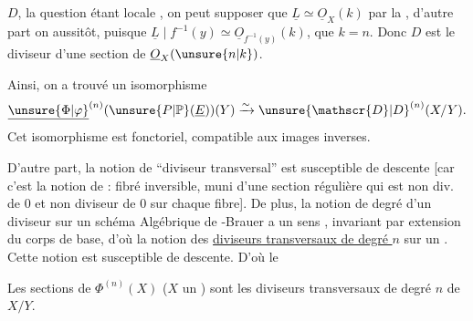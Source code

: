 $D$,  la question étant locale , on peut supposer que $\underline{L}\simeq\underline{O}_X(k)$ par la , d'autre part on  aussitôt, puisque $\underline{L}\mid f^{-1}(y)\simeq\underline{O}_{f^{-1}(y)}(k)$, que $k=n$. Donc $D$ est le diviseur d'une section de $\underline{O}_X(\unsure{n|k})$.

Ainsi, on a  trouvé un isomorphisme 
\[
\underline{\unsure{\Phi|\varphi}}^{(n)}(\unsure{P|\mathbb{P}}(\underline{E}))(Y)\xrightarrow{\sim}{\unsure{\mathscr{D}|D}}^{(n)}(X/Y).
\]
Cet isomorphisme est fonctoriel, compatible aux images inverses.

D'autre part, la notion de ``diviseur  transversal'' est susceptible de descente [car c'est la notion de : fibré inversible, muni d'une section régulière qui est non div. de $0$ et non diviseur de $0$ sur chaque fibre]. De plus, la notion de degré d'un diviseur sur un schéma Algébrique de -Brauer a un sens , invariant par extension du corps de base, d'où la notion des \uline{diviseurs  transversaux de degré $n$} sur un . Cette notion est susceptible de descente. D'où le

\uline{} Les sections de $\Phi^{(n)}(X)$ ($X$ un ) sont les diviseurs  transversaux de degré $n$ de $X/Y$.
